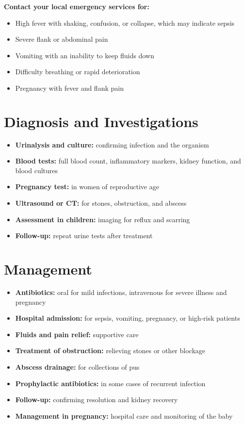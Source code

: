 \textbf{Contact your local emergency services for:}
\begin{itemize}
    \item High fever with shaking, confusion, or collapse, which may indicate sepsis
    \item Severe flank or abdominal pain
    \item Vomiting with an inability to keep fluids down
    \item Difficulty breathing or rapid deterioration
    \item Pregnancy with fever and flank pain
\end{itemize}

\section*{Diagnosis and Investigations}
\begin{itemize}
    \item \textbf{Urinalysis and culture:} confirming infection and the organism
    \item \textbf{Blood tests:} full blood count, inflammatory markers, kidney function, and blood cultures
    \item \textbf{Pregnancy test:} in women of reproductive age
    \item \textbf{Ultrasound or CT:} for stones, obstruction, and abscess
    \item \textbf{Assessment in children:} imaging for reflux and scarring
    \item \textbf{Follow-up:} repeat urine tests after treatment
\end{itemize}

\section*{Management}
\begin{itemize}
    \item \textbf{Antibiotics:} oral for mild infections, intravenous for severe illness and pregnancy
    \item \textbf{Hospital admission:} for sepsis, vomiting, pregnancy, or high-risk patients
    \item \textbf{Fluids and pain relief:} supportive care
    \item \textbf{Treatment of obstruction:} relieving stones or other blockage
    \item \textbf{Abscess drainage:} for collections of pus
    \item \textbf{Prophylactic antibiotics:} in some cases of recurrent infection
    \item \textbf{Follow-up:} confirming resolution and kidney recovery
    \item \textbf{Management in pregnancy:} hospital care and monitoring of the baby
\end{itemize}

